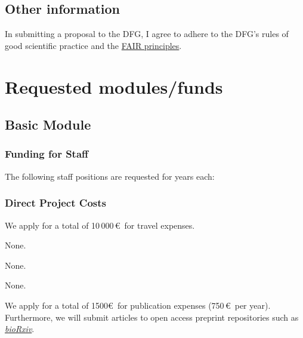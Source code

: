 \documentclass{scrartcl}
\begin{document}
\subsection{Other information}
In submitting a proposal to the DFG, I agree to adhere to the DFG's rules of good scientific practice and the \href{https://www.nature.com/articles/sdata201618}{FAIR principles}.

\section{Requested modules/funds}

\subsection{Basic Module}

\subsubsection{Funding for Staff}
\begin{funds}
	The following staff positions are requested for  years each:


\end{funds}


\subsubsection{Direct Project Costs}
\begin{funds}



	We apply for a total of 10\,000\,\euro\ for travel expenses.

	None.

	None.

	None.

	We apply for a total of 1500\euro\ for publication expenses (750\,\euro\ per
	year). Furthermore, we will submit articles to open access preprint repositories
	such as \href{https://www.biorxiv.org/}{\textit{bioRxiv}}.

\end{funds}
\end{document}
